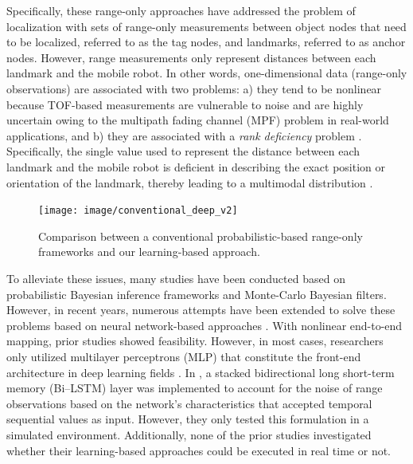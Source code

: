 \documentclass[letterpaper, 10 pt, conference]{ieeeconf}
\begin{document}
Specifically, these range-only approaches have addressed the problem of localization with sets of range-only measurements between object nodes that need to be localized, referred to as the tag nodes, and landmarks, referred to as anchor nodes. However, range measurements only represent distances between each landmark and the mobile robot. In other words, one-dimensional data (range-only observations) are associated with two problems: a) they tend to be nonlinear because TOF-based measurements are vulnerable to noise and are highly uncertain owing to the multipath fading channel (MPF) problem \cite{li2017novel} in real-world applications, and b) they are associated with a \textit{rank deficiency} problem \cite{fabresse2018efficient}. Specifically, the single value used to represent the distance between each landmark and the mobile robot is deficient in describing the exact position or orientation of the landmark, thereby leading to a multimodal distribution \cite{gonzalez2009mobile}. 

\begin{figure}[h]	
	\centering
	\texttt{[image: image/conventional\_deep\_v2]}
	
	\label{fig:overview}
	
	\caption{Comparison between a conventional probabilistic-based range-only frameworks and our learning-based approach.}
	
\end{figure}

To alleviate these issues, many studies have been conducted based on probabilistic Bayesian inference frameworks and Monte-Carlo Bayesian filters. However, in recent years, numerous attempts have been extended to solve these problems based on neural network-based approaches \cite{rahman2009localization, abdelhadi2013efficient, kumar2016localization, lim2018effective}. With nonlinear end-to-end mapping, prior studies showed feasibility. However, in most cases, researchers only utilized multilayer perceptrons (MLP) that constitute the front-end architecture in deep learning fields \cite{rahman2009localization, abdelhadi2013efficient, kumar2016localization}. In \cite{lim2018effective}, a stacked bidirectional long short-term memory (Bi--LSTM) layer was implemented to account for the noise of range observations based on the network’s  characteristics that accepted temporal sequential values as input. However, they only tested this formulation in a simulated environment\cite{rahman2009localization, abdelhadi2013efficient, kumar2016localization}. Additionally, none of the prior studies investigated whether their learning-based approaches could be executed in real time or not. 
\end{document}

